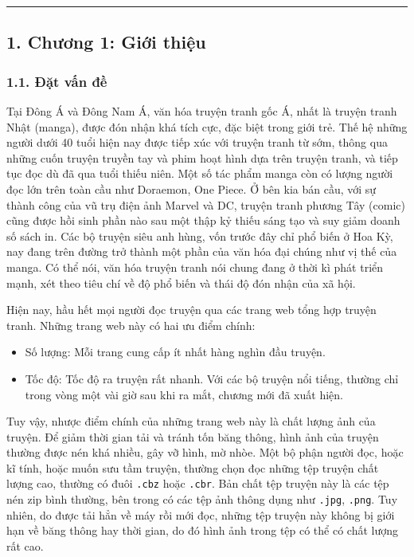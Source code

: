 \begin{center}\rule{0.5\linewidth}{0.5pt}\end{center}

\hypertarget{chux1b0ux1a1ng-1-giux1edbi-thiux1ec7u}{%
  \subsection{\texorpdfstring{1. Chương 1: Giới thiệu
    }{1. Chương 1: Giới thiệu }}\label{chux1b0ux1a1ng-1-giux1edbi-thiux1ec7u}}

\hypertarget{ux111ux1eb7t-vux1ea5n-ux111ux1ec1}{%
  \subsubsection{\texorpdfstring{1.1. Đặt vấn đề
    }{1.1. Đặt vấn đề }}\label{ux111ux1eb7t-vux1ea5n-ux111ux1ec1}}

Tại Đông Á và Đông Nam Á, văn hóa truyện tranh gốc Á, nhất là truyện
tranh Nhật (manga), được đón nhận khá tích cực, đặc biệt trong giới trẻ.
Thế hệ những người dưới 40 tuổi hiện nay được tiếp xúc với truyện tranh
từ sớm, thông qua những cuốn truyện truyền tay và phim hoạt hình dựa
trên truyện tranh, và tiếp tục đọc dù đã qua tuổi thiếu niên. Một số tác
phẩm manga còn có lượng người đọc lớn trên toàn cầu như Doraemon, One
Piece. Ở bên kia bán cầu, với sự thành công của vũ trụ điện ảnh Marvel
và DC, truyện tranh phương Tây (comic) cũng được hồi sinh phần nào sau
một thập kỷ thiếu sáng tạo và suy giảm doanh số sách in. Các bộ truyện
siêu anh hùng, vốn trước đây chỉ phổ biến ở Hoa Kỳ, nay đang trên đường
trở thành một phần của văn hóa đại chúng như vị thế của manga. Có thể
nói, văn hóa truyện tranh nói chung đang ở thời kì phát triển mạnh, xét
theo tiêu chí về độ phổ biến và thái độ đón nhận của xã hội.

Hiện nay, hầu hết mọi người đọc truyện qua các trang web tổng hợp truyện
tranh. Những trang web này có hai ưu điểm chính:

\begin{itemize}
  
  \item
        Số lượng: Mỗi trang cung cấp ít nhất hàng nghìn đầu truyện.
  \item
        Tốc độ: Tốc độ ra truyện rất nhanh. Với các bộ truyện nổi tiếng,
        thường chỉ trong vòng một vài giờ sau khi ra mắt, chương mới đã xuất
        hiện.
\end{itemize}

Tuy vậy, nhược điểm chính của những trang web này là chất lượng ảnh của
truyện. Để giảm thời gian tải và tránh tốn băng thông, hình ảnh của
truyện thường được nén khá nhiều, gây vỡ hình, mờ nhòe. Một bộ phận
người đọc, hoặc kĩ tính, hoặc muốn sưu tầm truyện, thường chọn đọc những
tệp truyện chất lượng cao, thường có đuôi \texttt{.cbz} hoặc
\texttt{.cbr}. Bản chất tệp truyện này là các tệp nén zip bình thường,
bên trong có các tệp ảnh thông dụng như \texttt{.jpg}, \texttt{.png}.
Tuy nhiên, do được tải hẳn về máy rồi mới đọc, những tệp truyện này
không bị giới hạn về băng thông hay thời gian, do đó hình ảnh trong tệp
có thể có chất lượng rất cao.


